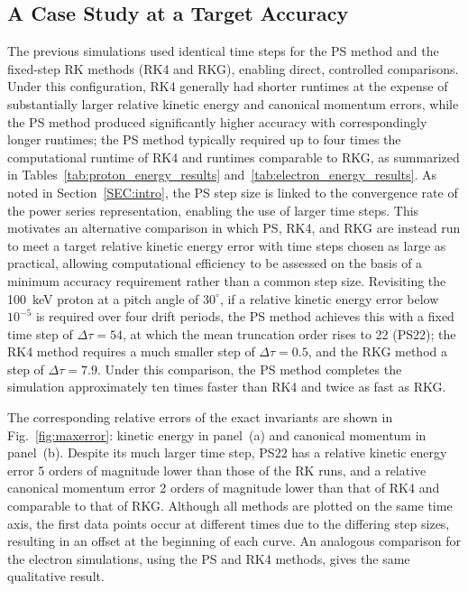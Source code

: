 \documentclass{article}
\begin{document}
\subsection{A Case Study at a Target Accuracy}\label{SEC:Dip Discussion}
The previous simulations used identical time steps for the PS method and the fixed-step RK methods (RK4 and RKG), enabling direct, controlled comparisons. Under this configuration, RK4 generally had shorter runtimes at the expense of substantially larger relative kinetic energy and canonical momentum errors, while the PS method produced significantly higher accuracy with correspondingly longer runtimes; the PS method typically required up to four times the computational runtime of RK4 and runtimes comparable to RKG, as summarized in Tables~\ref{tab:proton_energy_results} and~\ref{tab:electron_energy_results}. As noted in Section~\ref{SEC:intro}, the PS step size is linked to the convergence rate of the power series representation, enabling the use of larger time steps. This motivates an alternative comparison in which PS, RK4, and RKG are instead run to meet a target relative kinetic energy error with time steps chosen as large as practical, allowing computational efficiency to be assessed on the basis of a minimum accuracy requirement rather than a common step size. Revisiting the 100~keV proton at a pitch angle of $30^\circ$, if a relative kinetic energy error below $10^{-5}$ is required over four drift periods, the PS method achieves this with a fixed time step of $\Delta\tau=54$, at which the mean truncation order rises to 22 (PS22); the RK4 method requires a much smaller step of $\Delta\tau=0.5$, and the RKG method a step of $\Delta\tau=7.9$. Under this comparison, the PS method completes the simulation approximately ten times faster than RK4 and twice as fast as RKG. 

The corresponding relative errors of the exact invariants are shown in Fig.~\ref{fig:maxerror}: kinetic energy in panel~(a) and canonical momentum in panel~(b). Despite its much larger time step, PS22 has a relative kinetic energy error 5 orders of magnitude lower than those of the RK runs, and a relative canonical momentum error 2 orders of magnitude lower than that of RK4 and comparable to that of RKG. Although all methods are plotted on the same time axis, the first data points occur at different times due to the differing step sizes, resulting in an offset at the beginning of each curve. An analogous comparison for the electron simulations, using the PS and RK4 methods, gives the same qualitative result.
\end{document}
